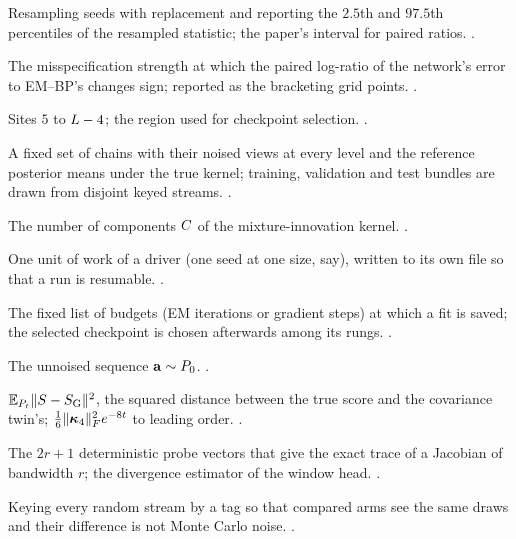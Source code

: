 \begin{description}[leftmargin=1.6em,itemsep=0.25em,font=\normalfont\bfseries]
\item[Bootstrap, percentile] Resampling seeds with replacement and reporting the $2.5$th
and $97.5$th percentiles of the resampled statistic; the paper's interval for paired
ratios. .

\item[Break-even] The misspecification strength at which the paired log-ratio of the
network's error to EM--BP's changes sign; reported as the bracketing grid points.
.

\item[Bulk region] Sites $5$ to $L-4$; the region used for checkpoint selection.
.

\item[Bundle] A fixed set of chains with their noised views at every level and the
reference posterior means under the true kernel; training, validation and test bundles
are drawn from disjoint keyed streams. .

\item[Capacity (mixture)] The number of components $C$ of the mixture-innovation
kernel. .

\item[Cell] One unit of work of a driver (one seed at one size, say), written to its own
file so that a run is resumable. .

\item[Checkpoint ladder] The fixed list of budgets (EM iterations or gradient steps) at
which a fit is saved; the selected checkpoint is chosen afterwards among its rungs.
.

\item[Clean chain] The unnoised sequence $\mathbf{a}\sim P_0$. .

\item[Closure gap] $\mathbb{E}_{P_t}\lVert S-S_{\mathrm{G}}\rVert^2$, the squared distance between
the true score and the covariance twin's; $\tfrac16\lVert \bm{\kappa}_4 \rVert_{F}^2e^{-8t}$ to leading order.
.

\item[Coloured probes] The $2r+1$ deterministic probe vectors that give the exact trace of
a Jacobian of bandwidth $r$; the divergence estimator of the window head.
.

\item[Common random numbers] Keying every random stream by a tag so that compared arms see
the same draws and their difference is not Monte Carlo noise. .


\end{description}
